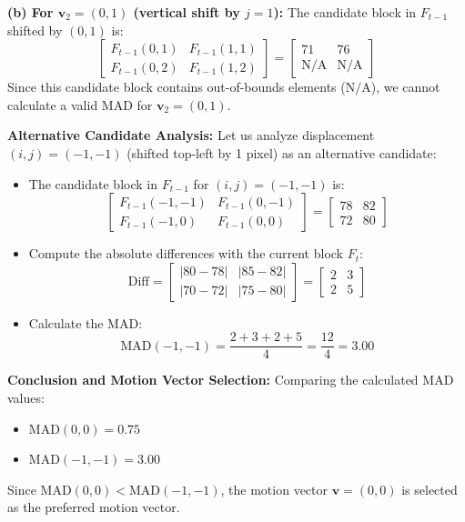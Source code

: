 \documentclass[12pt,a4paper]{article}
\begin{document}
\begin{tcolorbox}[examplebox, title={Motion Vector Estimation}]
\textbf{(b) For $\mathbf{v}_2 = (0,1)$ (vertical shift by $j=1$):}
The candidate block in $F_{t-1}$ shifted by $(0,1)$ is:
\[
  \begin{bmatrix} F_{t-1}(0,1) & F_{t-1}(1,1) \\ F_{t-1}(0,2) & F_{t-1}(1,2) \end{bmatrix} = \begin{bmatrix} 71 & 76 \\ \text{N/A} & \text{N/A} \end{bmatrix}
\]
Since this candidate block contains out-of-bounds elements ($\text{N/A}$), we cannot calculate a valid MAD for $\mathbf{v}_2 = (0,1)$.

\par\vspace{6pt}
\textbf{Alternative Candidate Analysis:}
Let us analyze displacement $(i,j) = (-1,-1)$ (shifted top-left by 1 pixel) as an alternative candidate:
\begin{itemize}[leftmargin=*, itemsep=4pt]
  \item The candidate block in $F_{t-1}$ for $(i,j) = (-1,-1)$ is:
    \[
      \begin{bmatrix} F_{t-1}(-1,-1) & F_{t-1}(0,-1) \\ F_{t-1}(-1,0) & F_{t-1}(0,0) \end{bmatrix} = \begin{bmatrix} 78 & 82 \\ 72 & 80 \end{bmatrix}
    \]
  \item Compute the absolute differences with the current block $F_t$:
    \[
      \text{Diff} = \begin{bmatrix} |80 - 78| & |85 - 82| \\ |70 - 72| & |75 - 80| \end{bmatrix} = \begin{bmatrix} 2 & 3 \\ 2 & 5 \end{bmatrix}
    \]
  \item Calculate the MAD:
    \[
      \text{MAD}(-1,-1) = \frac{2 + 3 + 2 + 5}{4} = \frac{12}{4} = 3.00
    \]
\end{itemize}

\par\vspace{6pt}
\textbf{Conclusion and Motion Vector Selection:}
Comparing the calculated MAD values:
\begin{itemize}[leftmargin=*, itemsep=3pt]
  \item $\text{MAD}(0,0) = 0.75$
  \item $\text{MAD}(-1,-1) = 3.00$
\end{itemize}
Since $\text{MAD}(0,0) < \text{MAD}(-1,-1)$, the motion vector $\mathbf{v} = (0,0)$ is selected as the preferred motion vector.
\end{tcolorbox}
\end{document}

